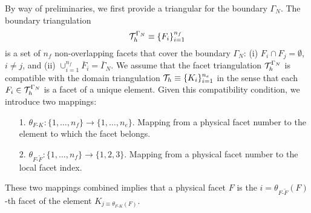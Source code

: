 By way of preliminaries, we first provide a triangular for the boundary $\Gamma_N$.  The boundary triangulation
\begin{equation*}
  \mathcal{T}_h^{\Gamma_N} \equiv \{ F_i \}_{i=1}^{n_f}
\end{equation*}
is a set of $n_f$ non-overlapping facets that cover the boundary $\Gamma_N$: (i) $F_i \cap F_j = \emptyset$, $i \neq j$, and (ii) $\cup_{i=1}^{n_f} \bar F_i = \bar \Gamma_N$.  We assume that the facet triangulation $\mathcal{T}_h^{\Gamma_N}$ is compatible with the domain triangulation $\mathcal{T}_h \equiv \{ K_i \}_{i=1}^{n_e}$ in the sense that each $F_i \in \mathcal{T}_h^{\Gamma_N}$ is a facet of a unique element.  Given this compatibility condition, we introduce two mappings:
\begin{itemize}
\item[1.] $\theta_{F\text{-}K}: \{ 1,\dots,n_f\} \to \{1,\dots,n_e\}$. Mapping from a physical facet number to the element to which the facet belongs.
\item[2.] $\theta_{F\text{-}\tilde F}: \{1,\dots,n_f\} \to \{1,2,3\}$. Mapping from a physical facet number to the local facet index.
\end{itemize}
These two mappings combined implies that a physical facet $F$ is the $i = \theta_{F\text{-}\tilde F}(F)$-th facet of the element $K_{j \equiv \theta_{F\text{-}K}(F)}$.

